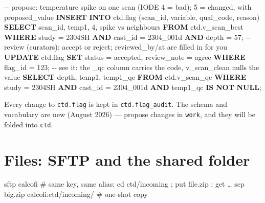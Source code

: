 \documentclass[
  letterpaper,
  DIV=11,
  numbers=noendperiod]{scrreprt}
\newenvironment{Shaded}{\begin{snugshade}}{\end{snugshade}}
\newcommand{\CommentTok}[1]{\textcolor[rgb]{0.37,0.37,0.37}{#1}}
\newcommand{\DecValTok}[1]{\textcolor[rgb]{0.68,0.00,0.00}{#1}}
\newcommand{\ExtensionTok}[1]{\textcolor[rgb]{0.00,0.23,0.31}{#1}}
\newcommand{\FunctionTok}[1]{\textcolor[rgb]{0.28,0.35,0.67}{#1}}
\newcommand{\KeywordTok}[1]{\textcolor[rgb]{0.00,0.23,0.31}{\textbf{#1}}}
\newcommand{\NormalTok}[1]{\textcolor[rgb]{0.00,0.23,0.31}{#1}}
\newcommand{\OperatorTok}[1]{\textcolor[rgb]{0.37,0.37,0.37}{#1}}
\newcommand{\StringTok}[1]{\textcolor[rgb]{0.13,0.47,0.30}{#1}}
\begin{document}
\begin{Shaded}
\begin{Highlighting}[]
\CommentTok{{-}{-} propose: temperature spike on one scan (IODE 4 = bad); 5 = changed, with proposed\_value}
\KeywordTok{INSERT} \KeywordTok{INTO}\NormalTok{ ctd.flag (scan\_id, variable, qual\_code, reason)}
\KeywordTok{SELECT}\NormalTok{ scan\_id, }\StringTok{\textquotesingle{}temp1\textquotesingle{}}\NormalTok{, }\DecValTok{4}\NormalTok{, }\StringTok{\textquotesingle{}spike vs neighbours\textquotesingle{}} \KeywordTok{FROM}\NormalTok{ ctd.v\_scan\_best}
\KeywordTok{WHERE}\NormalTok{ study }\OperatorTok{=} \StringTok{\textquotesingle{}2304SH\textquotesingle{}} \KeywordTok{AND}\NormalTok{ cast\_id }\OperatorTok{=} \StringTok{\textquotesingle{}2304\_001d\textquotesingle{}} \KeywordTok{AND} \FunctionTok{depth} \OperatorTok{=} \DecValTok{57}\NormalTok{;}
\CommentTok{{-}{-} review (curators): accept or reject; reviewed\_by/at are filled in for you}
\KeywordTok{UPDATE}\NormalTok{ ctd.flag }\KeywordTok{SET}\NormalTok{ status }\OperatorTok{=} \StringTok{\textquotesingle{}accepted\textquotesingle{}}\NormalTok{, review\_note }\OperatorTok{=} \StringTok{\textquotesingle{}agree\textquotesingle{}} \KeywordTok{WHERE}\NormalTok{ flag\_id }\OperatorTok{=} \DecValTok{123}\NormalTok{;}
\CommentTok{{-}{-} see it: the \_qc column carries the code, v\_scan\_clean nulls the value}
\KeywordTok{SELECT} \FunctionTok{depth}\NormalTok{, temp1, temp1\_qc }\KeywordTok{FROM}\NormalTok{ ctd.v\_scan\_qc }\KeywordTok{WHERE}\NormalTok{ study }\OperatorTok{=} \StringTok{\textquotesingle{}2304SH\textquotesingle{}} \KeywordTok{AND}\NormalTok{ cast\_id }\OperatorTok{=} \StringTok{\textquotesingle{}2304\_001d\textquotesingle{}} \KeywordTok{AND}\NormalTok{ temp1\_qc }\KeywordTok{IS} \KeywordTok{NOT} \KeywordTok{NULL}\NormalTok{;}
\end{Highlighting}
\end{Shaded}

Every change to \texttt{ctd.flag} is kept in \texttt{ctd.flag\_audit}.
The schema and vocabulary are new (August 2026) --- propose changes in
\texttt{work}, and they will be folded into \texttt{ctd}.

\section{Files: SFTP and the shared folder}\label{sec-sftp}

\begin{Shaded}
\begin{Highlighting}[]
\ExtensionTok{sftp}\NormalTok{ calcofi                       }\CommentTok{\# same key, same alias; cd ctd/incoming ; put file.zip ; get …}
\FunctionTok{scp}\NormalTok{ big.zip calcofi:ctd/incoming/   }\CommentTok{\# one{-}shot copy}
\end{Highlighting}
\end{Shaded}
\end{document}
